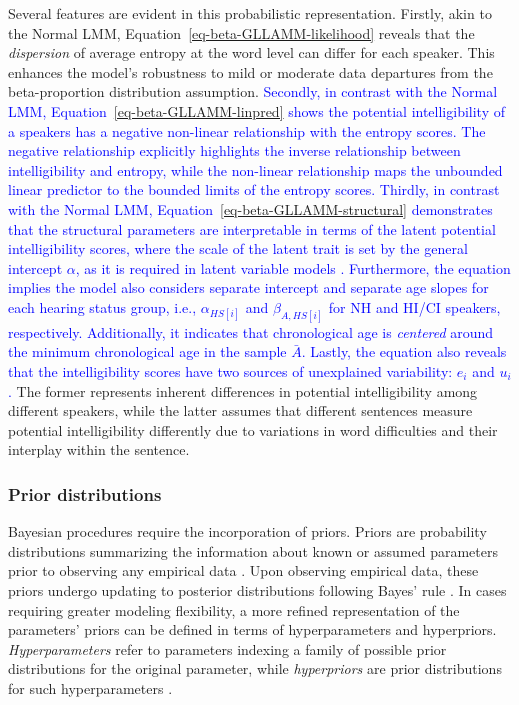 \documentclass[
  authoryear,
  preprint,
  1p]{elsarticle}
\begin{document}
Several features are evident in this probabilistic representation.
Firstly, akin to the Normal LMM,
Equation~\ref{eq-beta-GLLAMM-likelihood} reveals that the
\emph{dispersion} of average entropy at the word level can differ for
each speaker. This enhances the model's robustness to mild or moderate
data departures from the beta-proportion distribution assumption.
\textcolor{blue}{Secondly, in contrast with the Normal LMM,
Equation~\ref{eq-beta-GLLAMM-linpred} shows the potential
intelligibility of a speakers has a negative non-linear relationship
with the entropy scores. The negative relationship explicitly highlights
the inverse relationship between intelligibility and entropy, while the
non-linear relationship maps the unbounded linear predictor to the
bounded limits of the entropy scores. Thirdly, in contrast with the
Normal LMM, Equation~\ref{eq-beta-GLLAMM-structural} demonstrates that
the structural parameters are interpretable in terms of the latent
potential intelligibility scores, where the scale of the latent trait is
set by the general intercept \(\alpha\), as it is required in latent
variable models \citep{Depaoli_2021}. Furthermore, the equation implies
the model also considers separate intercept and separate age slopes for
each hearing status group, i.e., \(\alpha_{HS[i]}\) and
\(\beta_{A, HS[i]}\) for NH and HI/CI speakers, respectively.
Additionally, it indicates that chronological age is \emph{centered}
around the minimum chronological age in the sample \(\bar{A}\). Lastly,
the equation also reveals that the intelligibility scores have two
sources of unexplained variability: \(e_{i}\) and \(u_{i}\).} The former
represents inherent differences in potential intelligibility among
different speakers, while the latter assumes that different sentences
measure potential intelligibility differently due to variations in word
difficulties and their interplay within the sentence.

\subsubsection{Prior distributions}\label{sec-M-SM-P}

Bayesian procedures require the incorporation of priors. Priors are
probability distributions summarizing the information about known or
assumed parameters prior to observing any empirical data
\citep{Everitt_et_al_2010}. Upon observing empirical data, these priors
undergo updating to posterior distributions following Bayes' rule
\citep{Jeffreys_1998}. In cases requiring greater modeling flexibility,
a more refined representation of the parameters' priors can be defined
in terms of hyperparameters and hyperpriors. \emph{Hyperparameters}
refer to parameters indexing a family of possible prior distributions
for the original parameter, while \emph{hyperpriors} are prior
distributions for such hyperparameters \citep{Everitt_et_al_2010}.
\end{document}
